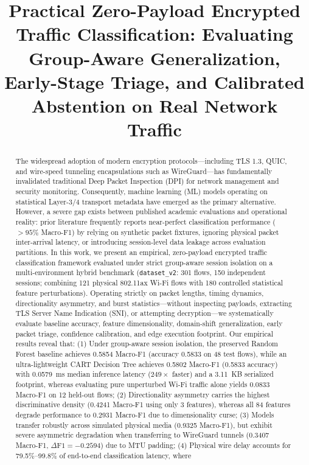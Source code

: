 \documentclass[conference]{IEEEtran}
\begin{document}
\title{Practical Zero-Payload Encrypted Traffic Classification: Evaluating Group-Aware Generalization, Early-Stage Triage, and Calibrated Abstention on Real Network Traffic}

\author{
}

\maketitle

\begin{abstract}
The widespread adoption of modern encryption protocols---including TLS 1.3, QUIC, and wire-speed tunneling encapsulations such as WireGuard---has fundamentally invalidated traditional Deep Packet Inspection (DPI) for network management and security monitoring. Consequently, machine learning (ML) models operating on statistical Layer-3/4 transport metadata have emerged as the primary alternative. However, a severe gap exists between published academic evaluations and operational reality: prior literature frequently reports near-perfect classification performance ($>95\%$ Macro-F1) by relying on synthetic packet fixtures, ignoring physical packet inter-arrival latency, or introducing session-level data leakage across evaluation partitions. In this work, we present an empirical, zero-payload encrypted traffic classification framework evaluated under strict group-aware session isolation on a multi-environment hybrid benchmark (\texttt{dataset\_v2}: 301 flows, 150 independent sessions; combining 121 physical 802.11ax Wi-Fi flows with 180 controlled statistical feature perturbations). Operating strictly on packet lengths, timing dynamics, directionality asymmetry, and burst statistics---without inspecting payloads, extracting TLS Server Name Indication (SNI), or attempting decryption---we systematically evaluate baseline accuracy, feature dimensionality, domain-shift generalization, early packet triage, confidence calibration, and edge execution footprint. Our empirical results reveal that: (1) Under group-aware session isolation, the preserved Random Forest baseline achieves 0.5854 Macro-F1 (accuracy 0.5833 on 48 test flows), while an ultra-lightweight CART Decision Tree achieves 0.5802 Macro-F1 (0.5833 accuracy) with 0.0579~ms median inference latency ($249\times$ faster) and a 3.11~KB serialized footprint, whereas evaluating pure unperturbed Wi-Fi traffic alone yields 0.0833 Macro-F1 on 12 held-out flows; (2) Directionality asymmetry carries the highest discriminative density (0.4241 Macro-F1 using only 3 features), whereas all 84 features degrade performance to 0.2931 Macro-F1 due to dimensionality curse; (3) Models transfer robustly across simulated physical media (0.9325 Macro-F1), but exhibit severe asymmetric degradation when transferring to WireGuard tunnels (0.3407 Macro-F1, $\Delta\text{F1} = -0.2594$) due to MTU padding; (4) Physical wire delay accounts for 79.5\%--99.8\% of end-to-end classification latency, where 
\end{abstract}
\end{document}
